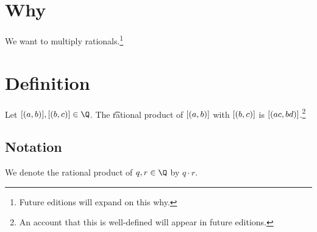 
\section*{Why}

We want to multiply rationals.\footnote{Future editions will expand on this why.}

\section*{Definition}

Let $\eqc{(a, b)}, \eqc{(b, c)} \in \Q $.
The \t{rational product} of $[(a, b)]$ with $[(b, c)]$ is $[(ac , bd)]$.\footnote{An account that this is well-defined will appear in future editions.}

\subsection*{Notation}

We denote the rational product of $q, r \in \Q $ by $q \cdot r$.

\blankpage
